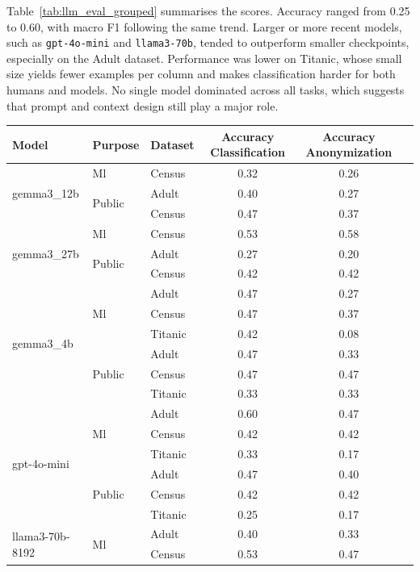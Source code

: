 \documentclass{article}
\begin{document}
Table~\ref{tab:llm_eval_grouped} summarises the scores.  
Accuracy ranged from 0.25 to 0.60, with macro F1 following the same trend.  
Larger or more recent models, such as \texttt{gpt-4o-mini} and \texttt{llama3-70b}, tended to outperform smaller checkpoints, especially on the Adult dataset.  
Performance was lower on Titanic, whose small size yields fewer examples per column and makes classification harder for both humans and models.  
No single model dominated across all tasks, which suggests that prompt and context design still play a major role.

\begin{table}[h!]
\centering
\small
\begin{tabular}{lllccl}
\toprule
\textbf{Model} & \textbf{Purpose} & \textbf{Dataset} & \textbf{Accuracy Classification} & \textbf{Accuracy Anonymization} \\
\midrule
\multirow{3}{*}{gemma3\_12b} & Ml & Census & 0.32 & 0.26 \\
 & \multirow{2}{*}{Public} & Adult & 0.40 & 0.27 \\
 &  & Census & 0.47 & 0.37 \\
\midrule
\multirow{3}{*}{gemma3\_27b} & Ml & Census & 0.53 & 0.58 \\
 & \multirow{2}{*}{Public} & Adult & 0.27 & 0.20 \\
 &  & Census & 0.42 & 0.42 \\
\midrule
\multirow{6}{*}{gemma3\_4b} & \multirow{3}{*}{Ml} & Adult & 0.47 & 0.27 \\
 &  & Census & 0.47 & 0.37 \\
 &  & Titanic & 0.42 & 0.08 \\
 & \multirow{3}{*}{Public} & Adult & 0.47 & 0.33 \\
 &  & Census & 0.47 & 0.47 \\
 &  & Titanic & 0.33 & 0.33 \\
\midrule
\multirow{6}{*}{gpt-4o-mini} & \multirow{3}{*}{Ml} & Adult & 0.60 & 0.47 \\
 &  & Census & 0.42 & 0.42 \\
 &  & Titanic & 0.33 & 0.17 \\
 & \multirow{3}{*}{Public} & Adult & 0.47 & 0.40 \\
 &  & Census & 0.42 & 0.42 \\
 &  & Titanic & 0.25 & 0.17 \\
\midrule
\multirow{6}{*}{llama3-70b-8192} & \multirow{3}{*}{Ml} & Adult & 0.40 & 0.33 \\
 &  & Census & 0.53 & 0.47 \\

\end{tabular}
\end{table}
\end{document}

